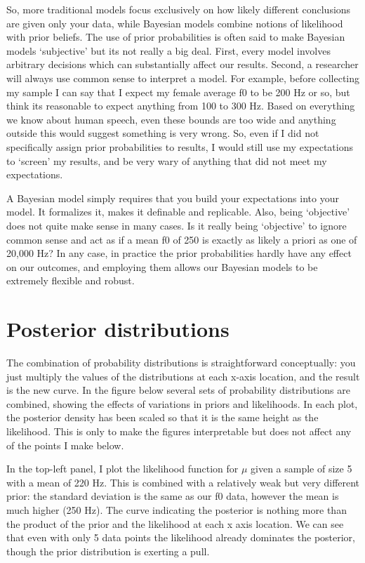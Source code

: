 \documentclass[
]{book}
\begin{document}
So, more traditional models focus exclusively on how likely different conclusions are given only your data, while Bayesian models combine notions of likelihood with prior beliefs. The use of prior probabilities is often said to make Bayesian models `subjective' but its not really a big deal. First, every model involves arbitrary decisions which can substantially affect our results. Second, a researcher will always use common sense to interpret a model. For example, before collecting my sample I can say that I expect my female average f0 to be 200 Hz or so, but think its reasonable to expect anything from 100 to 300 Hz. Based on everything we know about human speech, even these bounds are too wide and anything outside this would suggest something is very wrong. So, even if I did not specifically assign prior probabilities to results, I would still use my expectations to `screen' my results, and be very wary of anything that did not meet my expectations.

A Bayesian model simply requires that you build your expectations into your model. It formalizes it, makes it definable and replicable. Also, being `objective' does not quite make sense in many cases. Is it really being `objective' to ignore common sense and act as if a mean f0 of 250 is exactly as likely a priori as one of 20,000 Hz? In any case, in practice the prior probabilities hardly have any effect on our outcomes, and employing them allows our Bayesian models to be extremely flexible and robust.

\hypertarget{posterior-distributions}{%
\section{Posterior distributions}\label{posterior-distributions}}

The combination of probability distributions is straightforward conceptually: you just multiply the values of the distributions at each x-axis location, and the result is the new curve. In the figure below several sets of probability distributions are combined, showing the effects of variations in priors and likelihoods. In each plot, the posterior density has been scaled so that it is the same height as the likelihood. This is only to make the figures interpretable but does not affect any of the points I make below.

In the top-left panel, I plot the likelihood function for \(\mu\) given a sample of size 5 with a mean of 220 Hz. This is combined with a relatively weak but very different prior: the standard deviation is the same as our f0 data, however the mean is much higher (250 Hz). The curve indicating the posterior is nothing more than the product of the prior and the likelihood at each x axis location. We can see that even with only 5 data points the likelihood already dominates the posterior, though the prior distribution is exerting a pull.
\end{document}
